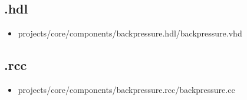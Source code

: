 \subsection*{\comp.hdl}
\begin{itemize}
	\item projects/core/components/backpressure.hdl/backpressure.vhd
\end{itemize}

\subsection*{\comp.rcc}
\begin{itemize}
	\item projects/core/components/backpressure.rcc/backpressure.cc
\end{itemize}

